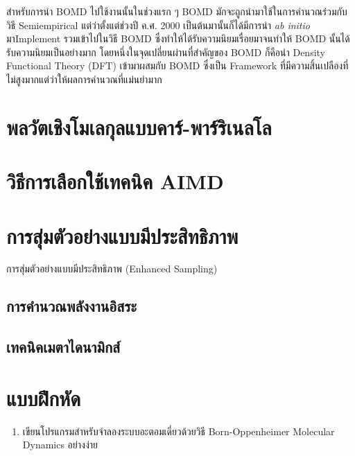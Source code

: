 สำหรับการนำ BOMD ไปใช้งานนั้นในช่วงแรก ๆ BOMD มักจะถูกนำมาใช้ในการคำนวณร่วมกับวิธี Semiempirical แต่ว่าตั้งแต่ช่วงปี ค.ศ. 2000
เป็นต้นมานั้นก็ได้มีการนำ \textit{ab initio} มาImplement รวมเข้าไปในวิธี BOMD ซึ่งทำให้ได้รับความนิยมเรื่อยมาจนทำให้ BOMD
นั้นได้รับความนิยมเป็นอย่างมาก โดยหนึ่งในจุดเปลี่ยนผ่านที่สำคัญของ BOMD ก็คือนำ Density Functional Theory (DFT) เข้ามาผสมกับ BOMD
ซึ่งเป็น Framework ที่มีความสิ้นเปลืองที่ไม่สูงมากแต่ว่าให้ผลการคำนวณที่แม่นยำมาก

\section{พลวัตเชิงโมเลกุลแบบคาร์-พาร์ริเนลโล}

\section{วิธีการเลือกใช้เทคนิค AIMD}

\section{การสุ่มตัวอย่างแบบมีประสิทธิภาพ}

การสุ่มตัวอย่างแบบมีประสิทธิภาพ (Enhanced Sampling)

\subsection{การคำนวณพลังงานอิสระ}

\subsection{เทคนิคเมตาไดนามิกส์}

\section{แบบฝึกหัด}

\begin{enumerate}[topsep=0pt,noitemsep]
  \setlength\itemsep{1em}
  \item เขียนโปรแกรมสำหรับจำลองระบบอะตอมเดี่ยวด้วยวิธี Born-Oppenheimer Molecular Dynamics อย่างง่าย
\end{enumerate}
